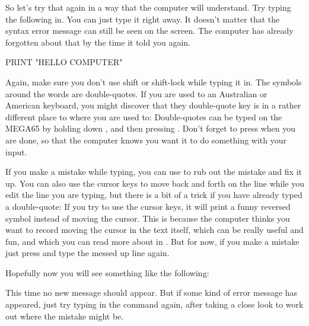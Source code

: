 \needspace{4cm} %

So let's try that again in a way that the computer will understand.  Try typing
  the following in.  You can just type it right away. It doesn't matter that the
  syntax error message can still be seen on the screen.  The computer has already
  forgotten about that by the time it told you  again.

\begin{screencode}
PRINT "HELLO COMPUTER"
\end{screencode}

Again, make sure you don't use shift or shift-lock while typing it in.  The symbols around
the words  are double-quotes.  If you are used to an Australian or American
keyboard, you might discover that they double-quote key is in a rather different place to
where you are used to:  Double-quotes can be typed on the MEGA65 by holding down
, and then pressing .  Don't forget to press 
when you are done, so that the computer knows you want it to do something with your input.

If you make a mistake while typing, you can use  to rub out the mistake
and fix it up.  You can also use the cursor keys to move back and forth on the line while
you edit the line you are typing, but there is a bit of a trick if you have already typed
a double-quote: If you try to use the cursor keys, it will print a funny reversed symbol
instead of moving the cursor.  This is because the computer thinks you want to record
moving the cursor in the text itself, which can be really useful and fun, and which you can
read more about in . But for now, if you
make a mistake just press  and type the messed up line again.

\needspace{4cm} %
Hopefully now you will see something like the following:


  This time no new  message should appear. But if some kind
  of error message has appeared, just try typing in the command again, after
  taking a close look to work out where the mistake might be.

